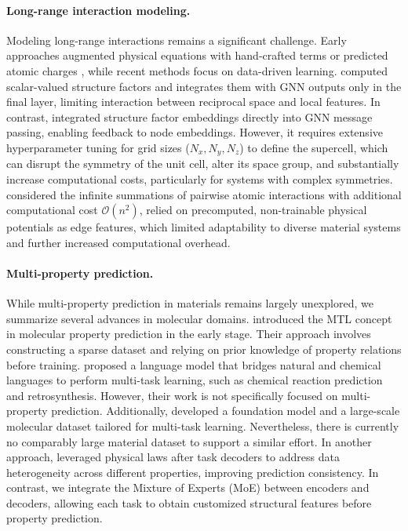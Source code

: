 \paragraph{Long-range interaction modeling.}
Modeling long-range interactions remains a significant challenge. Early approaches augmented physical equations with hand-crafted terms \citep{staacke2021role} or predicted atomic charges \citep{unke2021spookynet}, while recent methods focus on data-driven learning. 
\cite{yu2022capturing} computed scalar-valued structure factors and integrates them with GNN outputs only in the final layer, limiting interaction between reciprocal space and local features. In contrast, \cite{kosmala2023ewald} integrated structure factor embeddings directly into GNN message passing, enabling feedback to node embeddings. However, it requires extensive hyperparameter tuning for grid sizes ($N_x, N_y, N_z$) to define the supercell, which can disrupt the symmetry of the unit cell, alter its space group, and substantially increase computational costs, particularly for systems with complex symmetries.
\cite{lin2023efficient} considered the infinite summations of pairwise atomic interactions with additional computational cost $\mathcal{O}(n^2)$, relied on precomputed, non-trainable physical potentials as edge features, which limited adaptability to diverse material systems and further increased computational overhead.


\paragraph{Multi-property prediction.} While multi-property prediction in materials remains largely unexplored, we summarize several advances in molecular domains. \cite{liu2022structured} introduced the MTL concept in molecular property prediction in the early stage. Their approach involves constructing a sparse dataset and relying on prior knowledge of property relations before training. \cite{christofidellis2023unifying} proposed a language model that bridges natural and chemical languages to perform multi-task learning, such as chemical reaction prediction and retrosynthesis. However, their work is not specifically focused on multi-property prediction. Additionally, \cite{beaini2023towards} developed a foundation model and a large-scale molecular dataset tailored for multi-task learning. Nevertheless, there is currently no comparably large material dataset to support a similar effort. In another approach, \cite{ren2024physical} leveraged physical laws after task decoders to address data heterogeneity across different properties, improving prediction consistency. 
In contrast, we integrate the Mixture of Experts (MoE) between encoders and decoders, allowing each task to obtain customized structural features before property prediction.